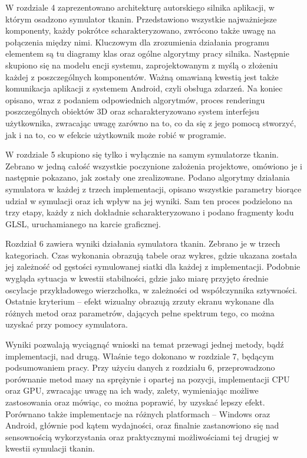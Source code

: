 	W rozdziale 4 zaprezentowano architekturę autorskiego silnika aplikacji, w którym osadzono symulator tkanin. Przedstawiono wszystkie najważniejsze komponenty, każdy pokrótce scharakteryzowano, zwrócono także uwagę na połączenia między nimi. Kluczowym dla zrozumienia działania programu elementem są tu diagramy klas oraz ogólne algorytmy pracy silnika. Następnie skupiono się na modelu encji systemu, zaprojektowanym z myślą o złożeniu każdej z poszczególnych komponentów. Ważną omawianą kwestią jest także komunikacja aplikacji z systemem Android, czyli obsługa zdarzeń. Na koniec opisano, wraz z podaniem odpowiednich algorytmów, proces renderingu poszczególnych obiektów 3D oraz scharakteryzowano system interfejsu użytkownika, zwracając uwagę zarówno na to, co da się z jego pomocą stworzyć, jak i na to, co w efekcie użytkownik może robić w programie.
	
	W rozdziale 5 skupiono się tylko i wyłącznie na samym symulatorze tkanin. Zebrano w jedną całość wszystkie poczynione założenia projektowe, omówiono je i następnie pokazano, jak zostały one zrealizowane. Podano algorytmy działania symulatora w każdej z trzech implementacji, opisano wszystkie parametry biorące udział w symulacji oraz ich wpływ na jej wyniki. Sam ten proces podzielono na trzy etapy, każdy z nich dokładnie scharakteryzowano i podano fragmenty kodu GLSL, uruchamianego na karcie graficznej.
	
	Rozdział 6 zawiera wyniki działania symulatora tkanin. Zebrano je w trzech kategoriach. Czas wykonania obrazują tabele oraz wykres, gdzie ukazana została jej zależność od gęstości symulowanej siatki dla każdej z implementacji. Podobnie wygląda sytuacja w kwestii stabilności, gdzie jako miarę przyjęto średnie oscylacje przykładowego wierzchołka, w zależności od współczynnika sztywności. Ostatnie kryterium -- efekt wizualny obrazują zrzuty ekranu wykonane dla różnych metod oraz parametrów, dających pełne spektrum tego, co można uzyskać przy pomocy symulatora. 
	
	Wyniki pozwalają wyciągnąć wnioski na temat przewagi jednej metody, bądź implementacji, nad drugą. Właśnie tego dokonano w rozdziale 7, będącym podsumowaniem pracy. Przy użyciu danych z rozdziału 6, przeprowadzono porównanie metod masy na sprężynie i opartej na pozycji, implementacji CPU oraz GPU, zwracając uwagę na ich wady, zalety, wymieniając możliwe zastosowania oraz mówiąc, co można poprawić, by uzyskać lepszy efekt. Porównano także implementacje na różnych platformach -- Windows oraz Android, głównie pod kątem wydajności, oraz finalnie zastanowiono się nad sensownością wykorzystania oraz praktycznymi możliwościami tej drugiej w kwestii symulacji tkanin.